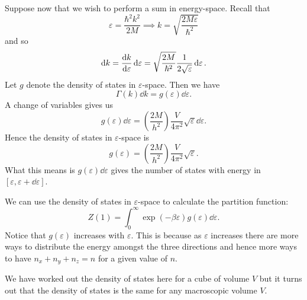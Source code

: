\documentclass[a4paper]{article}
\begin{document}
    Suppose now that we wish to perform a sum in energy-space.
    Recall that
    \[\varepsilon = \frac{\hbar^2k^2}{2M} \implies k = \sqrt{\frac{2M\varepsilon}{\hbar^2}}\]
    and so
    \[\dd{k} = \dv{k}{\varepsilon}\dd{\varepsilon} = \sqrt{\frac{2M}{\hbar^2}} \frac{1}{2\sqrt{\varepsilon}}\dd{\varepsilon}.\]
    Let \(g\) denote the density of states in \(\varepsilon\)-space.
    Then we have
    \[\Gamma(k)\dd{k} = g(\varepsilon)\dd{\varepsilon}.\]
    A change of variables gives us
    \[g(\varepsilon)\dd{\varepsilon} = \left( \frac{2M}{h^2} \right) \frac{V}{4\pi^2}\sqrt{\varepsilon}\dd{\varepsilon}.\]
    Hence the density of states in \(\varepsilon\)-space is
    \[g(\varepsilon) = \left( \frac{2M}{h^2} \right) \frac{V}{4\pi^2}\sqrt{\varepsilon}.\]
    What this means is \(g(\varepsilon)\dd{\varepsilon}\) gives the number of states with energy in \([\varepsilon, \varepsilon + \dd{\varepsilon}]\).
    
    We can use the density of states in \(\varepsilon\)-space to calculate the partition function:
    \[Z(1) = \int_{0}^{\infty} \exp(-\beta \varepsilon) g(\varepsilon) \dd{\varepsilon}.\]
    Notice that \(g(\varepsilon)\) increases with \(\varepsilon\).
    This is because as \(\varepsilon\) increases there are more ways to distribute the energy amongst the three directions and hence more ways to have \(n_x + n_y + n_z = n\) for a given value of \(n\).
    
    We have worked out the density of states here for a cube of volume \(V\) but it turns out that the density of states is the same for any macroscopic volume \(V\).
    
\end{document}
